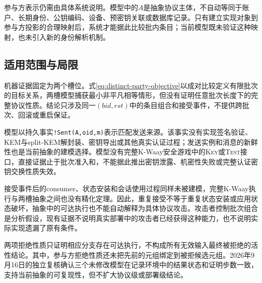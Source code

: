 参与方表示仍需由具体系统说明。模型中的$A$是抽象协议主体，不自动等同于账户、长期身份、公钥编码、设备、预密钥关联或数据库记录。只有建立实现对象到参与方投影的合理映射后，系统才能据此比较批内条目；当前模型既未验证这种映射，也未引入新的身份解析机制。

\subsection{适用范围与局限}
\label{subsec:scope-limitations}

机器证据固定为两个槽位。式\eqref{eq:distinct-party-objective}以成对比较定义有限批次的目标关系，两槽模型捕获最小非平凡相等情形，但没有证明任意批次长度下的完整协议性质。结论只涉及同一$(\mathit{bid},\mathit{rst})$中的条目组合和接受事件，不提供跨批次、回滚或重启保证。

模型以持久事实\texttt{!Sent(A,oid,m)}表示匹配发送来源。该事实没有实现签名验证、KEM与split-KEM解封装、密钥导出或其他真实认证过程；发送实例和消息的新鲜性也是当前抽象的建模选择。模型没有完整K-Waay安全游戏中的\textsc{Key}或\textsc{Test}接口，直接证据止于批次准入和\receiveraccept，不能据此推出密钥泄露、机密性失败或完整认证密钥交换性质失效。

接受事件后的consumer、状态安装和会话使用过程同样未被建模，完整K-Waay执行与两槽抽象之间也没有精化定理。因此，重复接受不等于重复状态安装或应用状态破坏，抽象中的可达执行也不能自动解释为具体协议攻击。攻击者控制批次组合是分析假设，现有证据不说明真实部署中的攻击者已经获得这种能力，也不说明实际实现遗漏了原有条件。

两项拒绝性质只证明相应分支存在可达执行，不构成所有无效输入最终被拒绝的活性结论。其中，参与方拒绝性质还未把先前的\sendaction 元组绑定到被拒候选元组。2026年9月16日的独立复核确认三个未修改模型在记录环境中的结果状态和证明步数一致，支持当前抽象的可复现性，但不扩大协议级或部署级结论。

